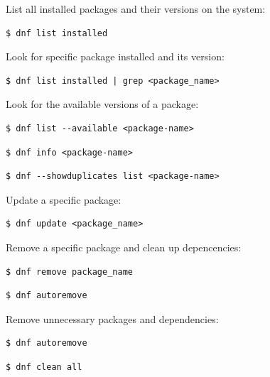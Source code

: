 \documentclass{article}
\newenvironment{codetemplate}[1][]{%
  \mybasecolorbox[#1]
  \itshape
}{%
  \endmybasecolorbox
}
\begin{document}
List all installed packages and their versions on the system:
\begin{codetemplate}
\begin{verbatim}
$ dnf list installed
\end{verbatim}
\end{codetemplate}

Look for specific package installed and its version:
\begin{codetemplate}
\begin{verbatim}
$ dnf list installed | grep <package_name>
\end{verbatim}
\end{codetemplate}

Look for the available versions of a package:
\begin{codetemplate}
\begin{verbatim}
$ dnf list --available <package-name>
\end{verbatim}
\end{codetemplate}
\begin{codetemplate}
\begin{verbatim}
$ dnf info <package-name>
\end{verbatim}
\end{codetemplate}
\begin{codetemplate}
\begin{verbatim}
$ dnf --showduplicates list <package-name>
\end{verbatim}
\end{codetemplate}

Update a specific package:
\begin{codetemplate}
\begin{verbatim}
$ dnf update <package_name>
\end{verbatim}
\end{codetemplate}

Remove a specific package and clean up depencencies:
\begin{codetemplate}
\begin{verbatim}
$ dnf remove package_name
\end{verbatim}
\end{codetemplate}
\begin{codetemplate}
\begin{verbatim}
$ dnf autoremove
\end{verbatim}
\end{codetemplate}

Remove unnecessary packages and dependencies:
\begin{codetemplate}
\begin{verbatim}
$ dnf autoremove
\end{verbatim}
\end{codetemplate}
\begin{codetemplate}
\begin{verbatim}
$ dnf clean all
\end{verbatim}
\end{codetemplate}
\end{document}
